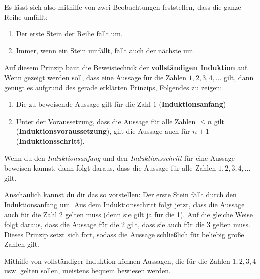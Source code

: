 \documentclass[../../main.tex]{subfiles}
\begin{document}
    Es lässt sich also mithilfe von zwei Beobachtungen feststellen, dass die ganze Reihe umfällt:
    \begin{enumerate}
        \item Der erste Stein der Reihe fällt um.
        \item Immer, wenn ein Stein umfällt, fällt auch der nächste um.
    \end{enumerate}
    Auf diesem Prinzip baut die Beweistechnik der \textbf{vollständigen Induktion} auf. Wenn gezeigt werden soll, dass eine Aussage für die Zahlen $1,2,3,4,\dots$ gilt, dann genügt es aufgrund des gerade erklärten Prinzips, Folgendes zu zeigen:
    \begin{enumerate}
        \item Die zu beweisende Aussage gilt für die Zahl $1$ (\textbf{Induktionsanfang})
        \item Unter der Voraussetzung, dass die Aussage für alle Zahlen $\leq n$ gilt (\textbf{In\-duk\-tions\-voraus\-setzung}), gilt die Aussage auch für $n+1$ (\textbf{Induktionsschritt}).
    \end{enumerate}
    Wenn du den \emph{Induktionsanfang} und den \emph{Induktionsschritt} für eine Aussage beweisen kannst, dann folgt daraus, dass die Aussage für alle Zahlen $1,2,3,4,\dots$ gilt.
    
    Anschaulich kannst du dir das so vorstellen: Der erste Stein fällt durch den Induktionsanfang um. Aus dem Induktionsschritt folgt jetzt, dass die Aussage auch für die Zahl 2 gelten muss (denn sie gilt ja für die 1). Auf die gleiche Weise folgt daraus, dass die Aussage für die 2 gilt, dass sie auch für die 3 gelten muss. Dieses Prinzip setzt sich fort, sodass die Aussage schließlich für beliebig große Zahlen gilt.
    
    Mithilfe von vollständiger Induktion können Aussagen, die für die Zahlen $1,2,3,4$ usw. gelten sollen, meistens bequem bewiesen werden.
\end{document}
